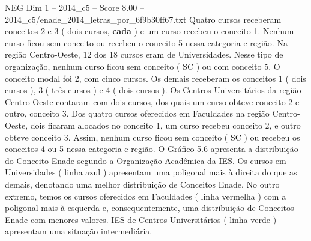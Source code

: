 \begin{textsample}{NEG Dim 1 – 2014\_c5 – Score 8.00 – 2014\_c5/enade\_2014\_letras\_por\_6f9b30ff67.txt}
Quatro cursos receberam conceitos 2 e 3 ( dois cursos, \textbf{cada} ) e um curso recebeu o conceito 1.
Nenhum curso ficou sem conceito ou recebeu o conceito 5 nessa categoria e região.
Na região Centro-Oeste, 12 dos 18 cursos eram de Universidades.
Nesse tipo de organização, nenhum curso ficou sem conceito ( SC ) ou com conceito 5.
O conceito modal foi 2, com cinco cursos.
Os demais receberam os conceitos 1 ( dois cursos ), 3 ( três cursos ) e 4 ( dois cursos ).
Os Centros Universitários da região Centro-Oeste contaram com dois cursos, dos quais um curso obteve conceito 2 e outro, conceito 3.
Dos quatro cursos oferecidos em Faculdades na região Centro-Oeste, dois ficaram alocados no conceito 1, um curso recebeu conceito 2, e outro obteve conceito 3.
Assim, nenhum curso ficou sem conceito ( SC ) ou recebeu os conceitos 4 ou 5 nessa categoria e região.
O Gráfico 5.6 apresenta a distribuição do Conceito Enade segundo a Organização Acadêmica da IES.
Os cursos em Universidades ( linha azul ) apresentam uma poligonal mais à direita do que as demais, denotando uma melhor distribuição de Conceitos Enade.
No outro extremo, temos os cursos oferecidos em Faculdades ( linha vermelha ) com a poligonal mais à esquerda e, consequentemente, uma distribuição de Conceitos Enade com menores valores.
IES de Centros Universitários ( linha verde ) apresentam uma situação intermediária.

\end{textsample}
